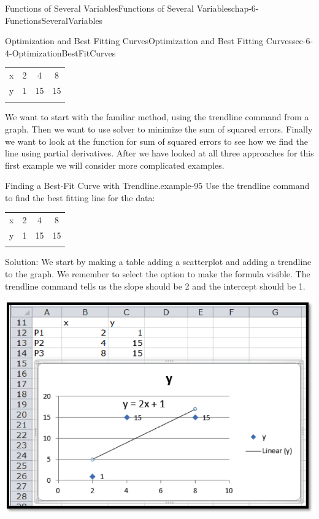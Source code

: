 \documentclass[oneside,10pt,]{book}
\numberwithin{equation}{section}
\newcommand{\hrulethin}  {\noalign{\hrule height 0.04em}}
\newcommand{\hrulethick} {\noalign{\hrule height 0.11em}}
\begin{document}
\begin{chapterptx}{Functions of Several Variables}{}{Functions of Several Variables}{}{}{chap-6-FunctionsSeveralVariables}
\begin{sectionptx}{Optimization and Best Fitting Curves}{}{Optimization and Best Fitting Curves}{}{}{sec-6-4-OptimizationBestFitCurves}
\begin{sidebyside}{1}{0}{0}{0}%
\begin{sbspanel}{1}%
{\centering%
\begin{tabular}{cccc}\hrulethick
x&2&4&8\tabularnewline\hrulethin
y&1&15&15\tabularnewline\hrulethin
\end{tabular}
\par}
\end{sbspanel}%
\end{sidebyside}%
 We want to start with the familiar method, using the trendline command from a graph.  Then we want to use solver to minimize the sum of squared errors.  Finally we want to look at the function for sum of squared errors to see how we find the line using partial derivatives.  After we have looked at all three approaches for this first example we will consider more complicated examples.%
\begin{example}{Finding a Best-Fit Curve with Trendline.}{example-95}%
\hypertarget{p-2444}{}%
Use the trendline command to find the best fitting line for the data:%
\begin{sidebyside}{1}{0}{0}{0}%
\begin{sbspanel}{1}%
{\centering%
\begin{tabular}{cccc}\hrulethick
x&2&4&8\tabularnewline\hrulethin
y&1&15&15\tabularnewline\hrulethin
\end{tabular}
\par}
\end{sbspanel}%
\end{sidebyside}%
\par
\hypertarget{p-2445}{}%
Solution:  We start by making a table adding a scatterplot and adding a trendline to the graph.  We remember to select the option to make the formula visible.  The trendline command tells us the slope should be 2 and the intercept should be 1.%
\begin{sidebyside}{1}{0.1}{0.1}{0}%
\begin{sbspanel}{0.8}%
\includegraphics[width=1\linewidth]{images/sec-6-4-2.png}

\end{sbspanel}
\end{sidebyside}
\end{example}
\end{sectionptx}
\end{chapterptx}
\end{document}
